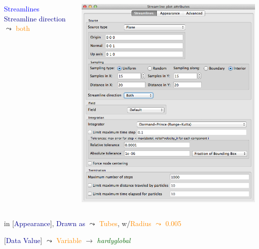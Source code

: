 \begin{frame}
\begin{columns}
\begin{column}{9cm}
\begin{beamerboxesrounded}[upper=block head,lower=block body,shadow=true]{\textcolor{DarkRed}{} \textcolor{blue}{Streamlines}}
	\hspace{3.5mm}
		\textcolor{DarkBlue}{Streamline direction} $\leadsto$ \textcolor{DarkOrange}{both}
	\end{beamerboxesrounded}
\end{column}
\begin{column}{3.5cm}
	\includegraphics[width=\columnwidth]{figs/visit-pract/VisIt_streamlines-attribs}
\end{column}
\end{columns}
\begin{columns}
\begin{column}{11cm}
	\pause
	\begin{beamerboxesrounded}[upper=block head,lower=block body,shadow=true]{}
	\vspace{1.75mm}
	\hspace{3.5mm}
		in [\textcolor{DarkBlue}{Appearance}],  \textcolor{DarkBlue}{Drawn as} $\leadsto$ \textcolor{DarkOrange}{Tubes}, w/\textcolor{DarkOrange}{Radius $\leadsto$ 0.005}

	\pause
	\hspace{3.5mm}
		[\textcolor{DarkBlue}{Data Value}] $\leadsto$ \textcolor{DarkOrange}{Variable} $\rightarrow$ \textcolor{DarkGreen}{\it hardyglobal}


\end{beamerboxesrounded}
\end{column}
\end{columns}
\end{frame}
